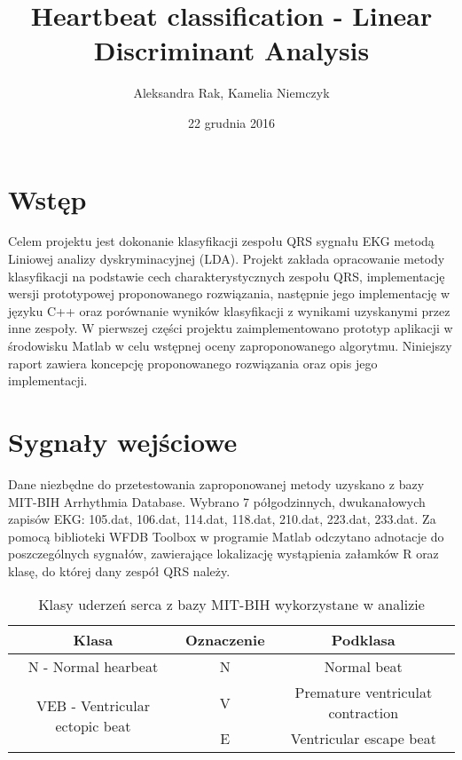 \documentclass{article}
\title{Heartbeat classification - Linear Discriminant Analysis}
\author{Aleksandra Rak, Kamelia Niemczyk }
\date{22 grudnia 2016}
\begin{document}
\maketitle

\section{Wstęp}

Celem projektu jest dokonanie klasyfikacji zespołu QRS sygnału EKG metodą Liniowej analizy dyskryminacyjnej (LDA). Projekt zakłada opracowanie metody klasyfikacji na podstawie cech charakterystycznych zespołu QRS, implementację wersji prototypowej proponowanego rozwiązania, następnie jego implementację w języku C++ oraz porównanie wyników klasyfikacji z wynikami uzyskanymi przez inne zespoły. W pierwszej części projektu zaimplementowano prototyp aplikacji w środowisku Matlab w celu wstępnej oceny zaproponowanego algorytmu. Niniejszy raport zawiera koncepcję proponowanego rozwiązania oraz opis jego implementacji.

\section{Sygnały wejściowe}

Dane niezbędne do przetestowania zaproponowanej metody uzyskano z bazy MIT-BIH Arrhythmia Database. Wybrano 7 półgodzinnych, dwukanałowych zapisów EKG: 105.dat, 106.dat, 114.dat, 118.dat, 210.dat, 223.dat, 233.dat. Za pomocą biblioteki WFDB Toolbox w programie Matlab odczytano adnotacje do poszczególnych sygnałów, zawierające lokalizację wystąpienia załamków R oraz klasę, do której dany zespół QRS należy.

\begin{table}[]
\centering
\caption{Klasy uderzeń serca z bazy MIT-BIH wykorzystane w analizie}
\label{my-label}
\begin{tabular}{c|c|c}
\textbf{Klasa}                                  & \textbf{Oznaczenie} & \textbf{Podklasa}                 \\ \hline
N - Normal hearbeat                             & N                   & Normal beat                       \\
\multirow{2}{*}{VEB - Ventricular ectopic beat} & V                   & Premature ventriculat contraction \\
                                                & E                   & Ventricular escape beat          
\end{tabular}
\end{table}
\end{document}
